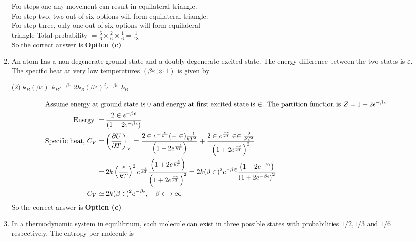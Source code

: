 \begin{enumerate}
\begin{answer}
		For steps one any movement can result in equilateral triangle.\\
		For step two, two out of six options will form equilateral triangle.\\
		For step three, only one out of six options will form equilateral\\ triangle Total probability $=\frac{6}{6} \times \frac{2}{6} \times \frac{1}{6}=\frac{1}{18}$\\
		So the correct answer is \textbf{Option (c)}
	\end{answer}
	\item 	An atom has a non-degenerate ground-state and a doubly-degenerate excited state. The energy difference between the two states is $\varepsilon$. The specific heat at very low temperatures $(\beta \varepsilon \gg 1)$ is given by
	{	}
	\begin{tasks}(2)
		\task[\textbf{a.}]$k_{B}(\beta \varepsilon)$
		\task[\textbf{b.}]$k_{B} e^{-\beta \varepsilon}$
		\task[\textbf{c.}] $2 k_{B}(\beta \varepsilon)^{2} e^{-\beta \varepsilon}$
		\task[\textbf{d.}]  $k_{B}$
	\end{tasks}
	\begin{answer}
		\begin{align*}
		\intertext{Assume energy at ground state is 0 and energy at first excited state is $\in$. The partition function is $Z=1+2 e^{-\beta \epsilon}$}
		\text{	Energy }&=\frac{2 \in e^{-\beta \epsilon}}{\left(1+2 e^{-\beta \epsilon}\right)}\\
		\text{Specific heat, }C_{V}&=\left(\frac{\partial U}{\partial T}\right)_{V}=\frac{2 \in e^{-\frac{\epsilon}{k T}}(-\in) \frac{-1}{k T^{2}}}{\left(1+2 e^{\frac{-\epsilon}{k T}}\right)}+\frac{2 \in e^{\frac{-\epsilon}{k T}} \in \in \frac{2}{k T^{2}}}{\left(1+2 e^{\frac{-\epsilon}{k T}}\right)^{2}}\\
		&=2 k\left(\frac{\epsilon}{k T}\right)^{2} e^{\frac{-\epsilon}{k T}} \frac{\left(1+2 e^{\frac{-\epsilon}{k T}}\right)}{\left(1+2 e^{\frac{-\epsilon}{k T}}\right)^{2}}=2 k(\beta \in)^{2} e^{-\beta \in} \frac{\left(1+2 e^{-\beta \epsilon}\right)}{\left(1+2 e^{-\beta \epsilon}\right)^{2}}\\
		C_{V} &\simeq 2 k(\beta \in)^{2} e^{-\beta \epsilon}, \quad \beta \in \rightarrow \infty
		\end{align*}
		So the correct answer is \textbf{Option (c)}
	\end{answer}
	\item In a thermodynamic system in equilibrium, each molecule can exist in three possible states with probabilities $1 / 2,1 / 3$ and $1 / 6$ respectively. The entropy per molecule is

\end{enumerate}
